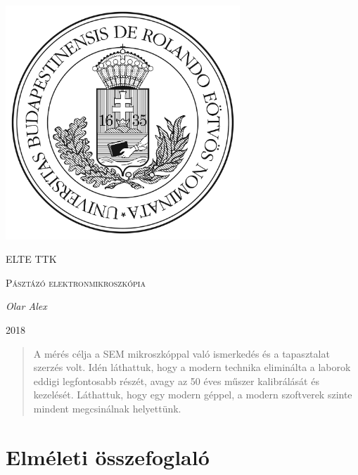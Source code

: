 \documentclass[a4paper,12pt]{article}
\begin{document}
\linespread{1.2}

\begin{titlepage}

	\centering
	\includegraphics[width=0.66\textwidth]{../elte.jpg}\par\vspace{1cm}
	{\scshape\LARGE ELTE TTK \par}
	\vspace{3cm}
	{\scshape\Large Pásztázó elektronmikroszkópia\par}
	\vspace{1cm}
	{\large\itshape Olar Alex\par}
	\vspace{3cm}
	{\large 2018 \par}

\end{titlepage}

\begin{abstract}
	\par A mérés célja a SEM mikroszkóppal való ismerkedés és a tapasztalat szerzés volt. Idén láthattuk, hogy
	a modern technika eliminálta a laborok eddigi legfontosabb részét, avagy az 50 éves műszer kalibrálását és
	kezelését. Láthattuk, hogy egy modern géppel, a modern szoftverek szinte mindent megcsinálnak helyettünk.
\end{abstract}

\vfill

\tableofcontents

\newpage

\section{Elméleti összefoglaló}
\end{document}
